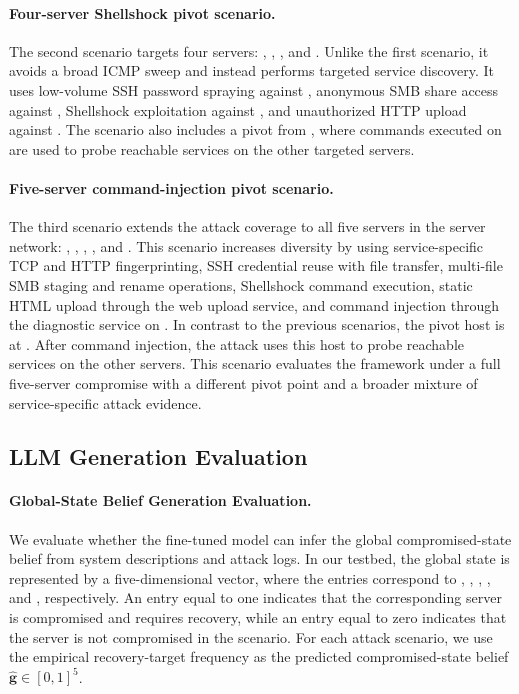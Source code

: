 \documentclass[sigconf]{acmart}
\begin{document}
\paragraph{Four-server Shellshock pivot scenario.}
The second scenario targets four servers: , , , and . Unlike the first scenario, it avoids a broad ICMP sweep and instead performs targeted service discovery. It uses low-volume SSH password spraying against , anonymous SMB share
access against , Shellshock exploitation against
, and unauthorized HTTP upload against
. The scenario also includes a pivot from
, where commands executed on  are used to probe reachable services on the other targeted servers.

\paragraph{Five-server command-injection pivot scenario.}
The third scenario extends the attack coverage to all five servers in the server network: , , , , and . This scenario increases diversity by using service-specific TCP and HTTP fingerprinting, SSH credential reuse with file transfer, multi-file SMB staging and rename operations, Shellshock command
execution, static HTML upload through the web upload service, and command injection through the diagnostic service on . In contrast to the previous scenarios, the pivot host is  at . After command injection, the attack uses this host to probe reachable services on the other servers. This scenario evaluates the framework under a full five-server compromise with a different pivot point and a broader mixture of service-specific attack evidence.

\subsection{LLM Generation Evaluation}

\paragraph{Global-State Belief Generation Evaluation.}
We evaluate whether the fine-tuned model can infer the global compromised-state
belief from system descriptions and attack logs. In our testbed, the global
state is represented by a five-dimensional vector, where the entries correspond
to , , , ,
and , respectively. An entry equal to one indicates that the
corresponding server is compromised and requires recovery, while an entry equal
to zero indicates that the server is not compromised in the scenario. For each
attack scenario, we use the empirical recovery-target
frequency as the predicted compromised-state belief
$\hat{\mathbf g}\in[0,1]^5$.
\end{document}
